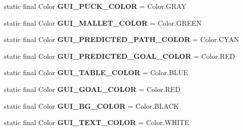 \begin{DoxyCompactItemize}
\item 
\hypertarget{classairhockeyjava_1_1game_1_1_constants_a6d36ced7383bead7be14b282bf88105d}{}static final Color {\bfseries G\+U\+I\+\_\+\+P\+U\+C\+K\+\_\+\+C\+O\+L\+O\+R} = Color.\+G\+R\+A\+Y\label{classairhockeyjava_1_1game_1_1_constants_a6d36ced7383bead7be14b282bf88105d}

\item 
\hypertarget{classairhockeyjava_1_1game_1_1_constants_a697abf886919670a1c775a5185a6502a}{}static final Color {\bfseries G\+U\+I\+\_\+\+M\+A\+L\+L\+E\+T\+\_\+\+C\+O\+L\+O\+R} = Color.\+G\+R\+E\+E\+N\label{classairhockeyjava_1_1game_1_1_constants_a697abf886919670a1c775a5185a6502a}

\item 
\hypertarget{classairhockeyjava_1_1game_1_1_constants_ad84610411ae31f364714f9dc233030b5}{}static final Color {\bfseries G\+U\+I\+\_\+\+P\+R\+E\+D\+I\+C\+T\+E\+D\+\_\+\+P\+A\+T\+H\+\_\+\+C\+O\+L\+O\+R} = Color.\+C\+Y\+A\+N\label{classairhockeyjava_1_1game_1_1_constants_ad84610411ae31f364714f9dc233030b5}

\item 
\hypertarget{classairhockeyjava_1_1game_1_1_constants_a82c2615177ebbb91a26996bd21bad9a4}{}static final Color {\bfseries G\+U\+I\+\_\+\+P\+R\+E\+D\+I\+C\+T\+E\+D\+\_\+\+G\+O\+A\+L\+\_\+\+C\+O\+L\+O\+R} = Color.\+R\+E\+D\label{classairhockeyjava_1_1game_1_1_constants_a82c2615177ebbb91a26996bd21bad9a4}

\item 
\hypertarget{classairhockeyjava_1_1game_1_1_constants_a7d792c09711ecf544d5c100498e949ad}{}static final Color {\bfseries G\+U\+I\+\_\+\+T\+A\+B\+L\+E\+\_\+\+C\+O\+L\+O\+R} = Color.\+B\+L\+U\+E\label{classairhockeyjava_1_1game_1_1_constants_a7d792c09711ecf544d5c100498e949ad}

\item 
\hypertarget{classairhockeyjava_1_1game_1_1_constants_a59e732812a3476c5dc9ac8483e8dccc6}{}static final Color {\bfseries G\+U\+I\+\_\+\+G\+O\+A\+L\+\_\+\+C\+O\+L\+O\+R} = Color.\+R\+E\+D\label{classairhockeyjava_1_1game_1_1_constants_a59e732812a3476c5dc9ac8483e8dccc6}

\item 
\hypertarget{classairhockeyjava_1_1game_1_1_constants_a52a5dea46089e26ff64e24b725c6aca3}{}static final Color {\bfseries G\+U\+I\+\_\+\+B\+G\+\_\+\+C\+O\+L\+O\+R} = Color.\+B\+L\+A\+C\+K\label{classairhockeyjava_1_1game_1_1_constants_a52a5dea46089e26ff64e24b725c6aca3}

\item 
\hypertarget{classairhockeyjava_1_1game_1_1_constants_a802b9c43ffa4e11875bf5211d710af73}{}static final Color {\bfseries G\+U\+I\+\_\+\+T\+E\+X\+T\+\_\+\+C\+O\+L\+O\+R} = Color.\+W\+H\+I\+T\+E\label{classairhockeyjava_1_1game_1_1_constants_a802b9c43ffa4e11875bf5211d710af73}


\end{DoxyCompactItemize}
